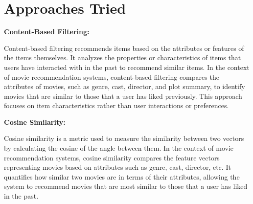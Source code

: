 \documentclass[a4paper]{article}
\theoremstyle{plain}
\theoremstyle{definition}
\begin{document}








	\newpage
	
\section{\LARGE Approaches Tried}
\label{sec:app}

\textbf{\Large Content-Based Filtering:}
\bigskip


Content-based filtering recommends items based on the attributes or features of the items themselves. It analyzes the properties or characteristics of items that users have interacted with in the past to recommend similar items. In the context of movie recommendation systems, content-based filtering compares the attributes of movies, such as genre, cast, director, and plot summary, to identify movies that are similar to those that a user has liked previously. This approach focuses on item characteristics rather than user interactions or preferences.

\bigskip

\textbf{\large \color[RGB]{50,50,50} Cosine Similarity:}



Cosine similarity is a metric used to measure the similarity between two vectors by calculating the cosine of the angle between them. In the context of movie recommendation systems, cosine similarity compares the feature vectors representing movies based on attributes such as genre, cast, director, etc. It quantifies how similar two movies are in terms of their attributes, allowing the system to recommend movies that are most similar to those that a user has liked in the past.
\end{document}
